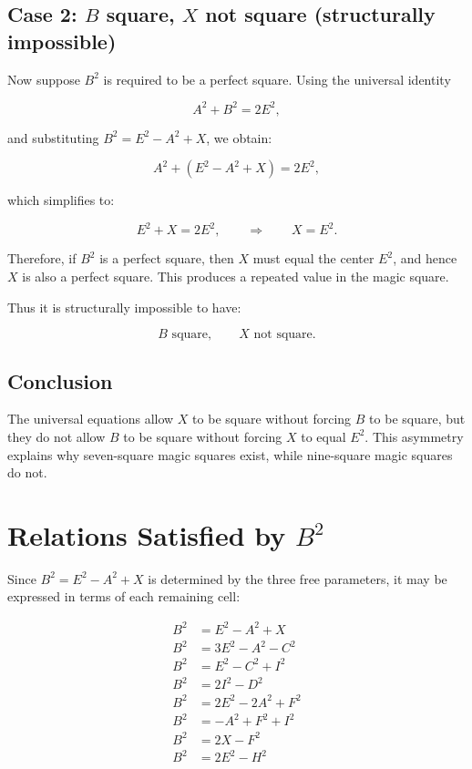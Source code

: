 \documentclass[12pt]{article}
\begin{document}
\subsection*{Case 2: $B$ square, $X$ not square (structurally impossible)}

Now suppose $B^2$ is required to be a perfect square.  
Using the universal identity


\[
A^2 + B^2 = 2E^2,
\]


and substituting $B^2 = E^2 - A^2 + X$, we obtain:


\[
A^2 + (E^2 - A^2 + X) = 2E^2,
\]


which simplifies to:


\[
E^2 + X = 2E^2,
\qquad\Rightarrow\qquad
X = E^2.
\]



Therefore, if $B^2$ is a perfect square, then $X$ must equal the center
$E^2$, and hence $X$ is also a perfect square.  
This produces a repeated value in the magic square.

Thus it is structurally impossible to have:


\[
B \text{ square}, \qquad X \text{ not square}.
\]



\subsection*{Conclusion}

The universal equations allow $X$ to be square without forcing $B$ to be
square, but they do not allow $B$ to be square without forcing $X$ to
equal $E^2$.  
This asymmetry explains why seven-square magic squares exist, while
nine-square magic squares do not.

\section{Relations Satisfied by $B^2$}

Since $B^2 = E^2 - A^2 + X$ is determined by the three free
parameters, it may be expressed in terms of each remaining cell:

\begin{align}
B^2 &= E^2 - A^2 + X \\
B^2 &= 3E^2 - A^2 - C^2 \\
B^2 &= E^2 - C^2 + I^2 \\
B^2 &= 2I^2 - D^2 \\
B^2 &= 2E^2 - 2A^2 + F^2 \\
B^2 &= -A^2 + F^2 + I^2 \\
B^2 &= 2X - F^2 \\
B^2 &= 2E^2 - H^2
\end{align}
\end{document}
